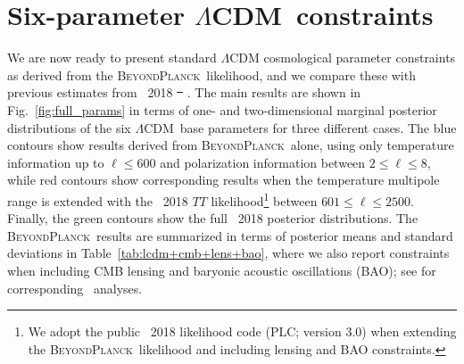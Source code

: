 \documentclass[onecolumn]{aa}
\def\LCDM{$\Lambda$CDM}
\newcommand{\BP}{\textsc{BeyondPlanck}}
\providecommand{\DIFaddtex}[1]{{\protect\color{blue}\uwave{#1}}} %
\providecommand{\DIFdeltex}[1]{{\protect\color{red}\sout{#1}}}                      %
\providecommand{\DIFaddbegin}{} %
\providecommand{\DIFaddend}{} %
\providecommand{\DIFdelbegin}{} %
\providecommand{\DIFdelend}{} %
\providecommand{\DIFadd}[1]{\texorpdfstring{\DIFaddtex{#1}}{#1}} %
\providecommand{\DIFdel}[1]{\texorpdfstring{\DIFdeltex{#1}}{}} %
\newcommand{\DIFscaledelfig}{0.5}
\newlength{\DIFdelgraphicswidth} %
\newlength{\DIFdelgraphicsheight} %
\newcommand{\DIFaddincludegraphics}[2][]{{\color{blue}\fbox{\DIFOincludegraphics[#1]{#2}}}} %
\newcommand{\DIFdelincludegraphics}[2][]{%
\sbox{\DIFdelgraphicsbox}{\DIFOincludegraphics[#1]{#2}}%
\settoboxwidth{\DIFdelgraphicswidth}{\DIFdelgraphicsbox} %
\settoboxtotalheight{\DIFdelgraphicsheight}{\DIFdelgraphicsbox} %
\scalebox{\DIFscaledelfig}{%
\parbox[b]{\DIFdelgraphicswidth}{\usebox{\DIFdelgraphicsbox}\\[-\baselineskip] \rule{\DIFdelgraphicswidth}{0em}}\llap{\resizebox{\DIFdelgraphicswidth}{\DIFdelgraphicsheight}{%
\setlength{\unitlength}{\DIFdelgraphicswidth}%
\begin{picture}(1,1)%
\thicklines\linethickness{2pt} %
{\color[rgb]{1,0,0}\put(0,0){\framebox(1,1){}}}%
{\color[rgb]{1,0,0}\put(0,0){\line( 1,1){1}}}%
{\color[rgb]{1,0,0}\put(0,1){\line(1,-1){1}}}%
\end{picture}%
}\hspace*{3pt}}} %
} %
\DeclareRobustCommand{\DIFaddbegin}{\DIFOaddbegin \let\includegraphics\DIFaddincludegraphics} %
\DeclareRobustCommand{\DIFaddend}{\DIFOaddend \let\includegraphics\DIFOincludegraphics} %
\DeclareRobustCommand{\DIFdelbegin}{\DIFOdelbegin \let\includegraphics\DIFdelincludegraphics} %
\DeclareRobustCommand{\DIFdelend}{\DIFOaddend \let\includegraphics\DIFOincludegraphics} %
\begin{document}
\section{Six-parameter \LCDM\ constraints}
\label{sec:LCDM_constraints}

We are now ready to present standard $\Lambda$CDM cosmological
parameter constraints as derived from the \BP\ likelihood, and we
compare these with previous estimates from \Planck\ 2018
\DIFdelbegin \DIFdel{\mbox{%
\citep{planck2016-l05}}\hspace{0pt}%
}\DIFdelend \DIFaddbegin \DIFadd{\mbox{%
\citep{planck2016-l06}}\hspace{0pt}%
}\DIFaddend . The main results are shown in
Fig.~\ref{fig:full_params} in terms of one- and two-dimensional
marginal posterior distributions of the six \LCDM\ base parameters for
three different cases. The blue contours show results derived from
\BP\ alone, using only temperature information up to $\ell\le600$ and
polarization information between $2\le\ell\le 8$, while red contours
show corresponding results when the temperature multipole range is
extended with the \Planck\ 2018 $TT$ likelihood\footnote{We adopt the
public \Planck\ 2018 likelihood code (PLC; version 3.0) when
extending the \BP\ likelihood and including lensing and BAO
constraints.} between $601\le\ell\le2500$. Finally, the green contours
show the full \Planck\ 2018 \DIFaddbegin \DIFadd{(TT + lowE) }\DIFaddend posterior distributions. The \BP\ results
are summarized in terms of posterior means and standard deviations in
Table~\ref{tab:lcdm+cmb+lens+bao}, where we also report constraints
when including CMB lensing and baryonic
acoustic oscillations (BAO); see \citep{planck2013-p11,
planck2014-a15} for corresponding \Planck\ analyses. 
\end{document}
